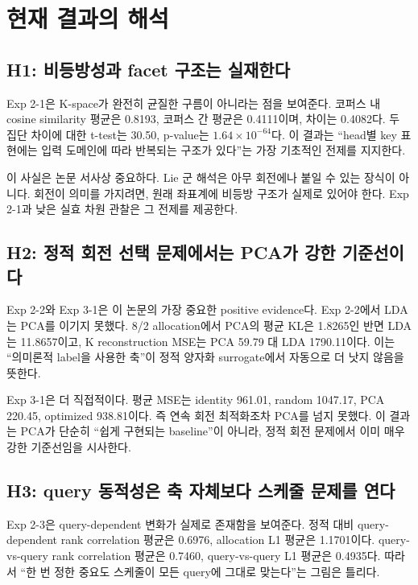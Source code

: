 \section{현재 결과의 해석}

\subsection{H1: 비등방성과 facet 구조는 실재한다}

Exp 2-1은 K-space가 완전히 균질한 구름이 아니라는 점을 보여준다. 코퍼스 내 cosine similarity 평균은 0.8193, 코퍼스 간 평균은 0.4111이며, 차이는 0.4082다. 두 집단 차이에 대한 t-test는 30.50, p-value는 $1.64\times10^{-64}$다. 이 결과는 ``head별 key 표현에는 입력 도메인에 따라 반복되는 구조가 있다''는 가장 기초적인 전제를 지지한다.

이 사실은 논문 서사상 중요하다. Lie 군 해석은 아무 회전에나 붙일 수 있는 장식이 아니다. 회전이 의미를 가지려면, 원래 좌표계에 비등방 구조가 실제로 있어야 한다. Exp 2-1과 낮은 실효 차원 관찰은 그 전제를 제공한다.

\subsection{H2: 정적 회전 선택 문제에서는 PCA가 강한 기준선이다}

Exp 2-2와 Exp 3-1은 이 논문의 가장 중요한 positive evidence다. Exp 2-2에서 LDA는 PCA를 이기지 못했다. 8/2 allocation에서 PCA의 평균 KL은 1.8265인 반면 LDA는 11.8657이고, K reconstruction MSE는 PCA 59.79 대 LDA 1790.11이다. 이는 ``의미론적 label을 사용한 축''이 정적 양자화 surrogate에서 자동으로 더 낫지 않음을 뜻한다.

Exp 3-1은 더 직접적이다. 평균 MSE는 identity 961.01, random 1047.17, PCA 220.45, optimized 938.81이다. 즉 연속 회전 최적화조차 PCA를 넘지 못했다. 이 결과는 PCA가 단순히 ``쉽게 구현되는 baseline''이 아니라, 정적 회전 문제에서 이미 매우 강한 기준선임을 시사한다.

\subsection{H3: query 동적성은 축 자체보다 스케줄 문제를 연다}

Exp 2-3은 query-dependent 변화가 실제로 존재함을 보여준다. 정적 대비 query-dependent rank correlation 평균은 0.6976, allocation L1 평균은 1.1701이다. query-vs-query rank correlation 평균은 0.7460, query-vs-query L1 평균은 0.4935다. 따라서 ``한 번 정한 중요도 스케줄이 모든 query에 그대로 맞는다''는 그림은 틀리다.

